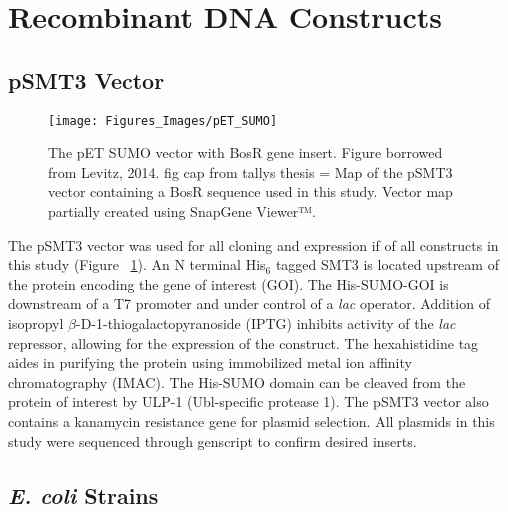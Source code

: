 \documentclass[12pt,twoside]{reedthesis}
\begin{document}
   \section{Recombinant DNA Constructs}
   
   \subsection{pSMT3 Vector}
   
   	\begin{figure}[h]
   		
   		\centering
   		\texttt{[image: Figures\_Images/pET\_SUMO]}
   		\caption[pET SUMO Vector with BosR Insert]{The pET SUMO vector with BosR gene insert. Figure borrowed from Levitz, 2014. fig cap from tallys thesis = Map of the pSMT3 vector containing a BosR sequence used in this study.
   			Vector map partially created using SnapGene Viewer™.}
   		\label{pETSUMOBosR}
   	\end{figure}
   	
   The pSMT3 vector was used for all cloning and expression if of all constructs in this study (Figure ~\ref{pETSUMOBosR}). An N terminal His$_{6}$ tagged SMT3 is located upstream of the protein encoding the gene of interest (GOI). The His-SUMO-GOI is downstream of a T7 promoter and  under control of a \textit{lac} operator. Addition of isopropyl $\beta$-D-1-thiogalactopyranoside (IPTG) inhibits activity of the \textit{lac} repressor, allowing for the expression of the construct. The hexahistidine tag aides in purifying the protein using immobilized metal ion affinity chromatography (IMAC). The His-SUMO domain can be cleaved from the protein of interest by ULP-1 (Ubl-specific protease 1). The pSMT3 vector also contains a kanamycin resistance gene for plasmid selection. All plasmids in this study were sequenced through genscript to confirm desired inserts. 
   
   \subsection{\textit{E. coli} Strains}
   
\end{document}
